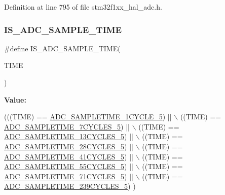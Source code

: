 Definition at line 795 of file stm32f1xx\+\_\+hal\+\_\+adc.\+h.

\mbox{\label{group___a_d_c___private___macros_ga30e0307fa009e1c383d3047b48e94644}} 
\subsubsection{\texorpdfstring{I\+S\+\_\+\+A\+D\+C\+\_\+\+S\+A\+M\+P\+L\+E\+\_\+\+T\+I\+ME}{IS\_ADC\_SAMPLE\_TIME}}
{\footnotesize\ttfamily \#define I\+S\+\_\+\+A\+D\+C\+\_\+\+S\+A\+M\+P\+L\+E\+\_\+\+T\+I\+ME(\begin{DoxyParamCaption}\item[{}]{T\+I\+ME }\end{DoxyParamCaption})}

{\bfseries Value\+:}
\begin{DoxyCode}
(((TIME) == \hyperlink{group___a_d_c__sampling__times_ga01ae8ddd4c3f0a7cace13273c1e67fdd}{ADC\_SAMPLETIME\_1CYCLE\_5})    || \(\backslash\)
                                  ((TIME) == \hyperlink{group___a_d_c__sampling__times_gac0aff040aa3a0e63147fcdd8ab805af1}{ADC\_SAMPLETIME\_7CYCLES\_5})   || \(\backslash\)
                                  ((TIME) == \hyperlink{group___a_d_c__sampling__times_ga96ddc2c8f5aec56ef5b6dc7cf908842a}{ADC\_SAMPLETIME\_13CYCLES\_5})  || \(\backslash\)
                                  ((TIME) == \hyperlink{group___a_d_c__sampling__times_ga2fb67421195d0c9f1edb705dcfcd754f}{ADC\_SAMPLETIME\_28CYCLES\_5})  || \(\backslash\)
                                  ((TIME) == \hyperlink{group___a_d_c__sampling__times_ga190357836133681e150ddc7242151661}{ADC\_SAMPLETIME\_41CYCLES\_5})  || \(\backslash\)
                                  ((TIME) == \hyperlink{group___a_d_c__sampling__times_ga4ea55e3a10a04630820387755f4f448a}{ADC\_SAMPLETIME\_55CYCLES\_5})  || \(\backslash\)
                                  ((TIME) == \hyperlink{group___a_d_c__sampling__times_ga15c48307b1f2aed2a1c3c6338c13b070}{ADC\_SAMPLETIME\_71CYCLES\_5})  || \(\backslash\)
                                  ((TIME) == \hyperlink{group___a_d_c__sampling__times_ga7172f3d957445df5b98648b25ccc64d4}{ADC\_SAMPLETIME\_239CYCLES\_5})   )
\end{DoxyCode}


